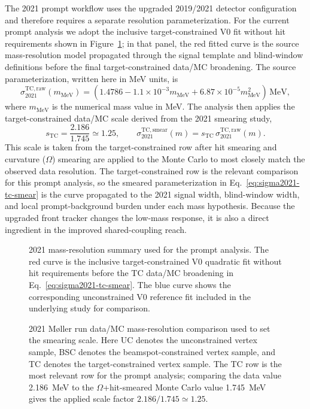 The 2021 prompt workflow uses the upgraded 2019/2021 detector configuration and
therefore requires a separate resolution parameterization. For the current prompt
analysis we adopt the inclusive target-constrained V0 fit without hit requirements
shown in Figure~\ref{fig:2021-resolution}; in that panel, the red fitted curve is the
source mass-resolution model propagated through the signal template and blind-window
definitions before the final target-constrained data/MC broadening. The source
parameterization, written here in MeV units, is
\begin{equation}
\sigma_{2021}^{\mathrm{TC,raw}}(m_{\mathrm{MeV}})
= \left(1.4786 - 1.1\times10^{-3}m_{\mathrm{MeV}}
  + 6.87\times10^{-5}m_{\mathrm{MeV}}^2\right)\,\mathrm{MeV},
\label{eq:sigma2021}
\end{equation}
where $m_{\mathrm{MeV}}$ is the numerical mass value in MeV. The analysis then applies the
target-constrained data/MC scale derived from the 2021 smearing study,
\begin{equation}
s_{\mathrm{TC}} = \frac{2.186}{1.745} \simeq 1.25,
\qquad
\sigma_{2021}^{\mathrm{TC,smear}}(m)
= s_{\mathrm{TC}}\,\sigma_{2021}^{\mathrm{TC,raw}}(m).
\label{eq:sigma2021-tc-smear}
\end{equation}
This scale is taken from the target-constrained row after hit smearing and curvature
($\Omega$) smearing are applied to the Monte Carlo to most closely match the observed
data resolution. The target-constrained row is the relevant comparison for this
prompt analysis, so the smeared parameterization in
Eq.~\ref{eq:sigma2021-tc-smear} is the curve propagated to the 2021 signal width,
blind-window width, and local prompt-background burden under each mass hypothesis.
Because the upgraded front tracker changes the low-mass response, it is also a direct
ingredient in the improved shared-coupling reach.

\begin{figure}[H]
\centering
{}
\caption{2021 mass-resolution summary used for the prompt analysis. The red curve is
the inclusive target-constrained V0 quadratic fit without hit requirements before the
TC data/MC broadening in Eq.~\ref{eq:sigma2021-tc-smear}. The blue curve shows the
corresponding unconstrained V0 reference fit included in the underlying study for
comparison.}
\label{fig:2021-resolution}
\end{figure}

\begin{figure}[H]
\centering
{}
\caption{2021 M{\o}ller run data/MC mass-resolution comparison used to set the
smearing scale.
Here UC denotes the unconstrained vertex sample, BSC denotes the beamspot-constrained
vertex sample, and TC denotes the target-constrained vertex sample. The TC row is the
most relevant row for the prompt analysis; comparing the data value
\SI{2.186}{MeV} to the $\Omega$+hit-smeared Monte Carlo value \SI{1.745}{MeV}
gives the applied scale factor $2.186/1.745\simeq1.25$.}
\label{fig:2021-data-mc-smearing-scale}
\end{figure}

